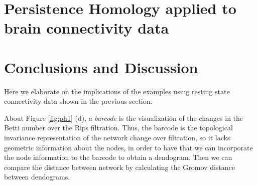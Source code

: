 \documentclass[onecollarge,runningheads]{svjour2}
\begin{document}
\section{Persistence Homology applied to brain connectivity data}
\label{se:exa}

\section{Conclusions and Discussion}
\label{se:conclusion}
Here we elaborate on the implications of the examples using resting state connectivity data shown in the previous section.

About Figure \ref{fig:ph1} (d), a \textit{barcode} is the visualization of the changes in the Betti number over the Rips filtration. Thus, the barcode is the topological invariance representation of the network change over filtration, so it lacks geometric information about the nodes, in order to have that we can incorporate the node information to the barcode to obtain a dendogram. Then we can compare the distance between network by calculating the Gromov distance between dendograms.


\end{document}

